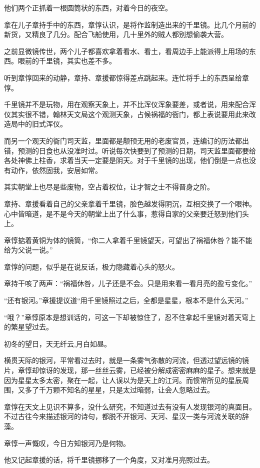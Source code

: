 他们两个正抓着一根圆筒状的东西，对着今日的夜空。

拿在儿子章持手中的东西，章惇认识，是将作监制造出来的千里镜。比几个月前的新货，又精良了几分。配合飞船使用，几十里外的贼人都别想偷袭大营。

之前显微镜传世，两个儿子都喜欢拿着看水、看土，看周边手上能派得上用场的东西。眼前的千里镜，其实也差不多。

听到章惇回来的动静，章持、章援都惊得差点跳起来。连忙将手上的东西呈给章惇。

千里镜并不是玩物，用在观察天象上，并不比浑仪浑象要差，或者说，用来配合浑仪其实很不错，翰林天文局这个观测天象，占候祸福的衙门，都上表说要用此来改造局中的旧式浑仪。

而另一个观天的衙门司天监，里面都是颟顸无用的老废官员，连编订的历法都出错，预测的日食也从没准时过。听说每次快要到了预测的日期，司天监里面都要给各处神佛上柱香，求着当天一定要是阴天。对于千里镜的出现，他们倒是一点也没有动作，依然固我，安居如常。

其实朝堂上也尽是些废物，空占着权位，让才智之士不得晋身之阶。

章持、章援看着自己的父亲拿着千里镜，脸色越发得阴沉，互相交换了一个眼神。心中皆暗道，是不是今天的朝堂上出了什么事，惹得自家的父亲要迁怒到他们头上。

章惇掂着黄铜为体的镜筒，“你二人拿着千里镜望天，可望出了祸福休咎？能不能给为父说一说。”

章惇的问题，似乎是在说反话，极力隐藏着心头的怒火。

章持干咳了两声：“祸福休咎，儿子还是不会。只是用来看一看月亮的盈亏变化。”

“还有银河。”章援提议道“用千里镜照过之后，全都是星星，根本不是什么天河。”

“哦？”章惇原本是想训话的，可这一下却被惊住了，忍不住拿起千里镜对着天穹上的繁星望过去。

初冬的望日，天无纤云,月白如昼。

横贯天际的银河，平常看过去时，就是一条雾气弥散的河流，但透过望远镜的镜片，章惇却惊讶的发现，那一丝丝云雾，已经被分解成密密麻麻的星子。想来就是因为星星太多太密，聚在一起，让人误以为是天上的江河。而惯常所见的星辰周围，又多了千万颗不知名的星星，只是太过暗弱，让会人忽略过去。

章惇在天文上见识不算多，没什么研究，不知道过去有没有人发现银河的真面目。不过古往今来描述银河的诗句，都脱不开银河、天河、星汉一类与河流关联的辞藻。

章惇一声慨叹，今日方知银河乃是何物。

他又记起章援的话，将千里镜挪移了一个角度，又对准月亮照过去。

